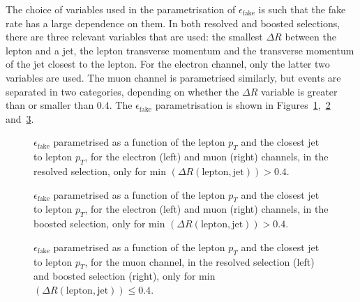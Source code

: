 The choice of variables used in the parametrisation of $\epsilon_{\textrm{fake}}$ is such that the fake rate has a large dependence on them.
In both resolved and
boosted selections, there are three relevant variables that are used: the smallest $\Delta R$ between the lepton and a jet, the lepton transverse momentum and the
transverse momentum of the jet closest to the lepton. For the electron channel, only the latter two variables are used. The muon channel is parametrised similarly, but events are separated in two categories, depending on whether the $\Delta R$ variable is greater than or smaller than $0.4$. The $\epsilon_{\textrm{fake}}$ parametrisation
is shown in Figures~\ref{fig:ttres8_qcd_fake_resolved},~\ref{fig:ttres8_qcd_fake_boosted} and~\ref{fig:ttres8_qcd_fake_mu}.

\begin{figure}
\centering
{}
\caption{$\epsilon_{\mathrm{fake}}$ parametrised as a function of the lepton $p_T$ and the closest jet to lepton $p_T$, for the electron (left) and muon (right) channels, in the resolved selection, only for min $(\Delta R(\textrm{lepton}, \textrm{jet})) > 0.4$.}
\label{fig:ttres8_qcd_fake_resolved}
\end{figure}

\begin{figure}
\centering
{}
\caption{$\epsilon_{\mathrm{fake}}$ parametrised as a function of the lepton $p_T$ and the closest jet to lepton $p_T$, for the electron (left) and muon (right) channels, in the boosted selection, only for min $(\Delta R(\textrm{lepton}, \textrm{jet})) > 0.4$.}
\label{fig:ttres8_qcd_fake_boosted}
\end{figure}

\begin{figure}
\centering
{}
\caption{$\epsilon_{\mathrm{fake}}$ parametrised as a function of the lepton $p_T$ and the closest jet to lepton $p_T$, for the muon channel, in the resolved selection (left) and boosted selection (right), only for min $(\Delta R(\textrm{lepton}, \textrm{jet})) \leq 0.4$.}
\label{fig:ttres8_qcd_fake_mu}
\end{figure}

